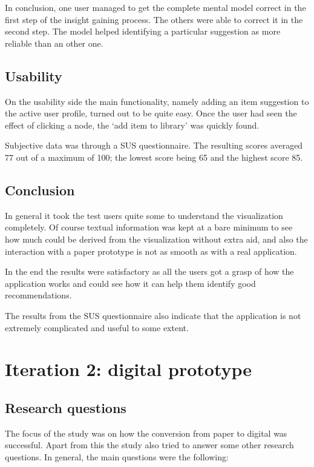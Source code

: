 In conclusion, one user managed to get the complete mental model correct in the first step of the insight gaining process. The others were able to correct it in the second step. The model helped identifying a particular suggestion as more reliable than an other one.

\subsection{Usability}

On the usability side the main functionality, namely adding an item suggestion to the active user profile, turned out to be quite easy. Once the user had seen the effect of clicking a node, the ‘add item to library’ was quickly found.

Subjective data was through a SUS questionnaire. The resulting scores averaged 77 out of a maximum of 100; the lowest score being 65 and the highest score 85.


\subsection{Conclusion}

In general it took the test users quite some to understand the visualization completely. Of course textual information was kept at a bare minimum to see how much could be derived from the visualization without extra aid, and also the interaction with a paper prototype is not as smooth as with a real application.

In the end the results were satisfactory as all the users got a grasp of how the application works and could see how it can help them identify good recommendations.

The results from the SUS questionnaire also indicate that the application is not extremely complicated and useful to some extent.


\section{Iteration 2: digital prototype}\label{chapter:prototype:section:digital}

\subsection{Research questions}

The focus of the study was on how the conversion from paper to digital was successful. Apart from this the study also tried to answer some other research questions. In general, the main questions were the following:

